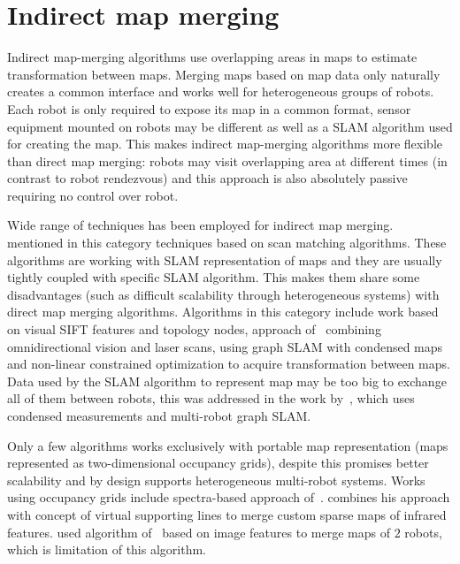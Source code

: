 \section{Indirect map merging}
\label{sec:indirect-map-merging}

Indirect map-merging algorithms use overlapping areas in maps to estimate transformation between maps. Merging maps based on map data only naturally creates a common interface and works well for heterogeneous groups of robots. Each robot is only required to expose its map in a common format, sensor equipment mounted on robots may be different as well as a \gls{SLAM} algorithm used for creating the map. This makes indirect map-merging algorithms more flexible than direct map merging: robots may visit overlapping area at different times (in contrast to robot rendezvous) and this approach is also absolutely passive requiring no control over robot.

Wide range of techniques has been employed for indirect map merging. \cite{Lee2012} mentioned in this category techniques based on scan matching algorithms. These algorithms are working with \gls{SLAM} representation of maps and they are usually tightly coupled with specific \gls{SLAM} algorithm. This makes them share some disadvantages (such as difficult scalability through heterogeneous systems) with direct map merging algorithms. Algorithms in this category include \cite{Wang2012} work based on visual \gls{SIFT} features and topology nodes, approach of~\cite{Tungandi2010} combining omnidirectional vision and laser scans, \cite{Cunningham2012} using graph \gls{SLAM} with condensed maps and non-linear constrained optimization to acquire transformation between maps. Data used by the \gls{SLAM} algorithm to represent map may be too big to exchange all of them between robots, this was addressed in the work by~\cite{Lazaro2013}, which uses condensed measurements and multi-robot graph \gls{SLAM}.

Only a few algorithms works exclusively with portable map representation (maps represented as two-dimensional occupancy grids), despite this promises better scalability and by design supports heterogeneous multi-robot systems. Works using occupancy grids include spectra-based approach of~\cite{Carpin2008}. \cite{Lee2011} combines his approach with concept of virtual supporting lines to merge custom sparse maps of infrared features. \cite{martins2013mrslam} used algorithm of~\cite{MapstitchROS} based on image features to merge maps of $2$ robots, which is limitation of this algorithm.

